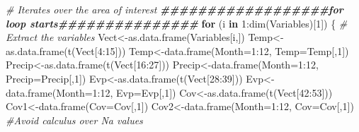\documentclass[
  10pt,
  b5paper,
]{book}
\newenvironment{Shaded}{\begin{snugshade}}{\end{snugshade}}
\newcommand{\AttributeTok}[1]{\textcolor[rgb]{0.77,0.63,0.00}{#1}}
\newcommand{\CommentTok}[1]{\textcolor[rgb]{0.56,0.35,0.01}{\textit{#1}}}
\newcommand{\ControlFlowTok}[1]{\textcolor[rgb]{0.13,0.29,0.53}{\textbf{#1}}}
\newcommand{\DecValTok}[1]{\textcolor[rgb]{0.00,0.00,0.81}{#1}}
\newcommand{\DocumentationTok}[1]{\textcolor[rgb]{0.56,0.35,0.01}{\textbf{\textit{#1}}}}
\newcommand{\FunctionTok}[1]{\textcolor[rgb]{0.00,0.00,0.00}{#1}}
\newcommand{\NormalTok}[1]{#1}
\newcommand{\OtherTok}[1]{\textcolor[rgb]{0.56,0.35,0.01}{#1}}
\newcommand{\SpecialCharTok}[1]{\textcolor[rgb]{0.00,0.00,0.00}{#1}}
\begin{document}
\begin{Shaded}
\begin{Highlighting}[]
\CommentTok{\# Iterates over the area of interest}
\DocumentationTok{\#\#\#\#\#\#\#\#\#\#\#\#\#\#\#\#\#\#for loop starts\#\#\#\#\#\#\#\#\#\#\#\#\#\#\#}
\ControlFlowTok{for}\NormalTok{ (i }\ControlFlowTok{in} \DecValTok{1}\SpecialCharTok{:}\FunctionTok{dim}\NormalTok{(Variables)[}\DecValTok{1}\NormalTok{]) \{}
\CommentTok{\# Extract the variables }
\NormalTok{Vect}\OtherTok{\textless{}{-}}\FunctionTok{as.data.frame}\NormalTok{(Variables[i,])}
\NormalTok{Temp}\OtherTok{\textless{}{-}}\FunctionTok{as.data.frame}\NormalTok{(}\FunctionTok{t}\NormalTok{(Vect[}\DecValTok{4}\SpecialCharTok{:}\DecValTok{15}\NormalTok{]))}
\NormalTok{Temp}\OtherTok{\textless{}{-}}\FunctionTok{data.frame}\NormalTok{(}\AttributeTok{Month=}\DecValTok{1}\SpecialCharTok{:}\DecValTok{12}\NormalTok{, }\AttributeTok{Temp=}\NormalTok{Temp[,}\DecValTok{1}\NormalTok{])}
\NormalTok{Precip}\OtherTok{\textless{}{-}}\FunctionTok{as.data.frame}\NormalTok{(}\FunctionTok{t}\NormalTok{(Vect[}\DecValTok{16}\SpecialCharTok{:}\DecValTok{27}\NormalTok{]))}
\NormalTok{Precip}\OtherTok{\textless{}{-}}\FunctionTok{data.frame}\NormalTok{(}\AttributeTok{Month=}\DecValTok{1}\SpecialCharTok{:}\DecValTok{12}\NormalTok{, }\AttributeTok{Precip=}\NormalTok{Precip[,}\DecValTok{1}\NormalTok{])}
\NormalTok{Evp}\OtherTok{\textless{}{-}}\FunctionTok{as.data.frame}\NormalTok{(}\FunctionTok{t}\NormalTok{(Vect[}\DecValTok{28}\SpecialCharTok{:}\DecValTok{39}\NormalTok{]))}
\NormalTok{Evp}\OtherTok{\textless{}{-}}\FunctionTok{data.frame}\NormalTok{(}\AttributeTok{Month=}\DecValTok{1}\SpecialCharTok{:}\DecValTok{12}\NormalTok{, }\AttributeTok{Evp=}\NormalTok{Evp[,}\DecValTok{1}\NormalTok{])}
\NormalTok{Cov}\OtherTok{\textless{}{-}}\FunctionTok{as.data.frame}\NormalTok{(}\FunctionTok{t}\NormalTok{(Vect[}\DecValTok{42}\SpecialCharTok{:}\DecValTok{53}\NormalTok{]))}
\NormalTok{Cov1}\OtherTok{\textless{}{-}}\FunctionTok{data.frame}\NormalTok{(}\AttributeTok{Cov=}\NormalTok{Cov[,}\DecValTok{1}\NormalTok{])}
\NormalTok{Cov2}\OtherTok{\textless{}{-}}\FunctionTok{data.frame}\NormalTok{(}\AttributeTok{Month=}\DecValTok{1}\SpecialCharTok{:}\DecValTok{12}\NormalTok{, }\AttributeTok{Cov=}\NormalTok{Cov[,}\DecValTok{1}\NormalTok{])}
\CommentTok{\#Avoid calculus over Na values }

\end{Highlighting}
\end{Shaded}
\end{document}

